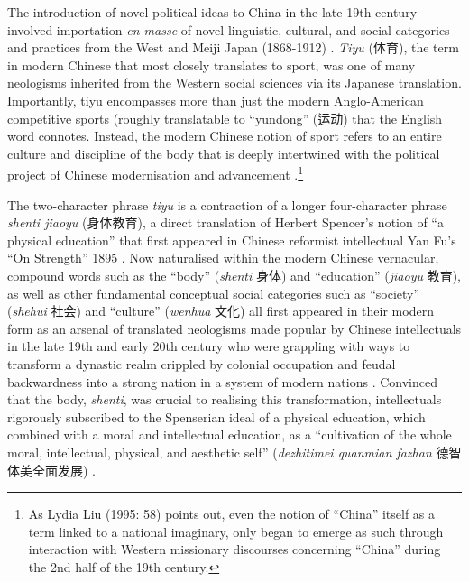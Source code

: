 {The introduction of novel political ideas to China in the late 19th century involved importation \textit{en masse} of novel linguistic, cultural, and social categories and practices from the West and Meiji Japan (1868-1912) \citep{Liu1995}. \textit{Tiyu} (体育), the term in modern Chinese that most closely translates to sport, was one of many neologisms inherited from the Western social sciences via its Japanese translation.  Importantly, tiyu encompasses more than just the modern Anglo-American competitive sports (roughly translatable to ``yundong'' (运动) that the English word connotes.  Instead, the modern Chinese notion of sport refers to an entire culture and discipline of the body that is deeply intertwined with the political project of Chinese modernisation and advancement \citep{Morris2004}.\footnote{As Lydia Liu (1995: 58) points out, even the notion of “China” itself as a term linked to a national imaginary, only began to emerge as such through interaction with Western missionary discourses concerning ``China'' during the 2nd half of the 19th century.}

The two-character phrase \textit{tiyu} is a contraction of a longer four-character phrase \textit{shenti jiaoyu} (身体教育), a direct translation of Herbert Spencer’s notion of  ``a physical education'' that first appeared in Chinese reformist intellectual Yan Fu’s ``On Strength'' 1895 \citep[9-10]{Morris2004}.  Now naturalised within the modern Chinese vernacular, compound words such as the ``body'' (\textit{shenti} 身体) and ``education'' (\textit{jiaoyu} 教育), as well as other fundamental conceptual social categories such as ``society'' (\textit{shehui} 社会) and ``culture'' (\textit{wenhua} 文化) all first appeared in their modern form as an arsenal of translated neologisms made popular by Chinese intellectuals in the late 19th and early 20th century who were grappling with ways to transform a dynastic realm crippled by colonial occupation and feudal backwardness into a strong nation in a system of modern nations \citep{Pusey1983;Schwartz1964;Liu 1995;Huters2005}.   Convinced that the body, \textit{shenti}, was crucial to realising this transformation, intellectuals rigorously subscribed to the Spenserian ideal of a physical education, which combined with a moral and intellectual education, as a ``cultivation of the whole moral, intellectual, physical, and aesthetic self'' (\textit{dezhitimei quanmian fazhan} 德智体美全面发展) \citep[10]{Morris2004}.

}
